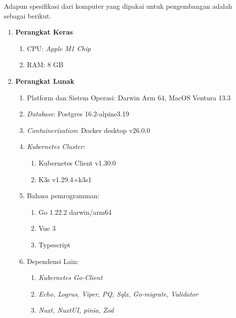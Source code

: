 Adapun spesifikasi dari komputer yang dipakai untuk pengembangan adalah sebagai berikut.
\begin{enumerate}
  \item \textbf{Perangkat Keras}

        \begin{enumerate}
          \item CPU: \textit{Apple M1 Chip}
          \item RAM: 8 GB
        \end{enumerate}

  \item \textbf{Perangkat Lunak}

        \begin{enumerate}
          \item Platform dan Sistem Operasi: Darwin Arm 64, MacOS Ventura 13.3
          \item \textit{Database}: Postgres 16.2-alpine3.19
          \item \textit{Containerization}: Docker desktop v26.0.0
          \item \textit{Kubernetes Cluster}:
                \begin{enumerate}
                  \item Kubernetes Client v1.30.0
                  \item K3s v1.29.4+k3s1
                \end{enumerate}
          \item Bahasa pemrogramman:
                \begin{enumerate}
                  \item Go 1.22.2 darwin/arm64
                  \item Vue 3
                  \item Typescript
                \end{enumerate}
          \item Dependensi Lain:
                \begin{enumerate}
                  \item \textit{Kubernetes Go-Client}
                  \item \textit{Echo, Logrus, Viper, PQ, Sqlx, Go-migrate, Validator}
                  \item \textit{Nuxt, NuxtUI, pinia, Zod}
                \end{enumerate}
        \end{enumerate}
\end{enumerate}